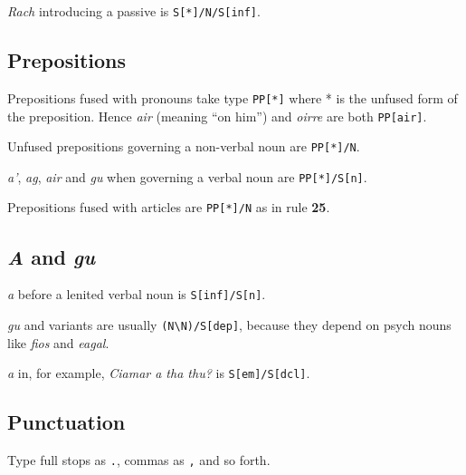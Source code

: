 \documentclass[a4paper]{article}
\begin{document}
 \textit{Rach} introducing a passive is \texttt{S[*]/N/S[inf]}.

\subsection{Prepositions}

 Prepositions fused with pronouns take type \texttt{PP[*]} where * is the unfused form of the preposition.
Hence \textit{air} (meaning ``on him'') and \textit{oirre} are both \texttt{PP[air]}.

 Unfused prepositions governing a non-verbal noun are \texttt{PP[*]/N}.

 \textit{a'}, \textit{ag}, \textit{air} and \textit{gu} when governing a verbal noun are \texttt{PP[*]/S[n]}.

 Prepositions fused with articles are \texttt{PP[*]/N} as in rule {\bf 25}.

\subsection{\textit{A} and \textit{gu}}

 \textit{a} before a lenited verbal noun is \texttt{S[inf]/S[n]}.

 \textit{gu} and variants are usually \texttt{(N\textbackslash N)/S[dep]}, because they depend on psych nouns like \textit{fios} and \textit{eagal}.

 \textit{a} in, for example, \textit{Ciamar a tha thu?} is \texttt{S[em]/S[dcl]}.

\subsection{Punctuation}

 Type full stops as \texttt{.}, commas as \texttt{,} and so forth.
\end{document}
